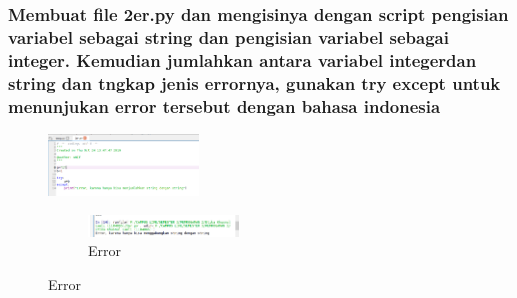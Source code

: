 \subsubsection{Membuat file 2er.py dan mengisinya dengan script pengisian variabel sebagai string dan pengisian variabel sebagai integer. Kemudian jumlahkan antara variabel integerdan string dan tngkap jenis errornya, gunakan try except untuk menunjukan error tersebut dengan bahasa indonesia}

\begin{figure}[H]
		\includegraphics[width=4cm]{figures/1184065/2er.PNG}
		\centering
		\caption{Kodingan Variabel sebagai string dan variabel sebagai integer }
		\begin{figure}[H]
		\includegraphics[width=4cm]{figures/1184065/2erError.PNG}
		\centering
		\caption{Error}
\end{figure}
\end{figure}
